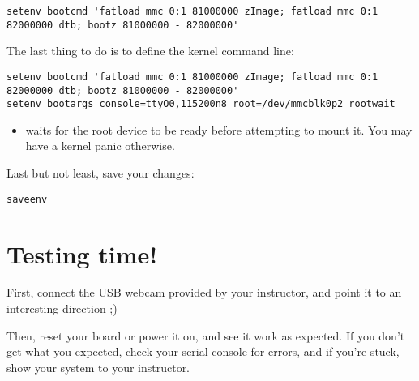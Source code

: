 {\footnotesize
\begin{verbatim}
setenv bootcmd 'fatload mmc 0:1 81000000 zImage; fatload mmc 0:1 82000000 dtb; bootz 81000000 - 82000000'
\end{verbatim}
}

{\footnotesize
The last thing to do is to define the kernel command line:
\begin{verbatim}
setenv bootcmd 'fatload mmc 0:1 81000000 zImage; fatload mmc 0:1 82000000 dtb; bootz 81000000 - 82000000'
setenv bootargs console=ttyO0,115200n8 root=/dev/mmcblk0p2 rootwait
\end{verbatim}
}

\begin{itemize}
\item {} waits for the root device to be ready before
attempting to mount it. You may have a kernel panic otherwise.
\end{itemize}

Last but not least, save your changes:
\begin{verbatim}
saveenv
\end{verbatim}

\section{Testing time!}

First, connect the USB webcam provided by your instructor, and point it
to an interesting direction ;)

Then, reset your board or power it on, and see it work as expected. If
you don't get what you expected, check your serial console for errors,
and if you're stuck, show your system to your instructor.
